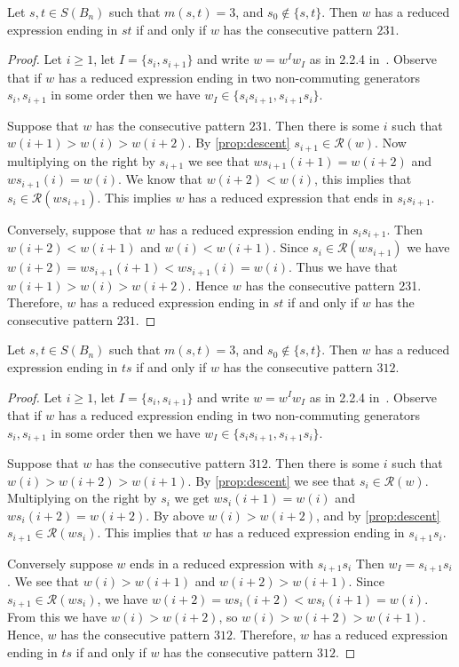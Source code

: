 \begin{lemma}\label{lem:ts}
Let $s,t \in S(B_n)$ such that $m(s,t)=3$, and $s_0 \notin \{s,t\}.$ Then $w$ has a reduced expression ending in $st$ if and only if $w$ has the consecutive pattern $231$.
\begin{proof}
	Let $i \geq 1$, let $I=\{s_i,s_{i+1}\}$ and write $w=w^Iw_I$ as in 2.2.4 in~\cite{Bjorner2005}. Observe that if $w$ has a reduced expression ending in two non-commuting generators $s_i, s_{i+1}$ in some order then we have $w_I \in \{s_is_{i+1}, s_{i+1}s_i\}$.
	
	Suppose that $w$ has the consecutive pattern $231$. Then there is some $i$ such that $w(i+1)>w(i)>w(i+2)$. By \ref{prop:descent} $s_{i+1} \in \mathcal{R}(w)$. Now multiplying on the right by $s_{i+1}$ we see that $ws_{i+1}(i+1)=w(i+2)$ and $ws_{i+1}(i)=w(i)$. We know that $w(i+2)<w(i)$, this implies that $s_i \in \mathcal{R}(ws_{i+1})$. This implies $w$ has a reduced expression that ends in $s_is_{i+1}$.
	
	 Conversely, suppose that $w$ has a reduced expression ending in $s_is_{i+1}$. Then $w(i+2)<w(i+1)$ and $w(i)<w(i+1)$. Since $s_i \in \mathcal{R}(ws_{i+1})$ we have $w(i+2)=ws_{i+1}(i+1)<ws_{i+1}(i)=w(i)$. Thus we have that $w(i+1) > w(i) > w(i+2)$. Hence $w$ has the consecutive pattern 231.
	Therefore, $w$ has a reduced expression ending in $st$ if and only if $w$ has the consecutive pattern $231$.
\end{proof}	
\end{lemma}


\begin{lemma}\label{lem:st}
Let $s,t \in S(B_n)$ such that $m(s,t)=3$, and $s_0 \notin \{s,t\}.$ Then $w$ has a reduced expression ending in $ts$ if and only if $w$ has the consecutive pattern $312$.
\begin{proof}
	Let $i \geq 1$, let $I=\{s_i,s_{i+1}\}$ and write $w=w^Iw_I$ as in 2.2.4 in~\cite{Bjorner2005}. Observe that if $w$ has a reduced expression ending in two non-commuting generators $s_i, s_{i+1}$ in some order then we have $w_I \in \{s_is_{i+1}, s_{i+1}s_i\}$.
	
	Suppose that $w$ has the consecutive pattern $312$.  Then there is some $i$ such that $w(i)>w(i+2)>w(i+1)$. By \ref{prop:descent} we see that $s_i \in \mathcal{R}(w)$. Multiplying on the right by $s_i$ we get $ws_i(i+1)=w(i)$ and $ws_i(i+2)=w(i+2)$. By above $w(i)>w(i+2)$, and by \ref{prop:descent} $s_{i+1} \in \mathcal{R}(ws_i)$. This implies that $w$ has a reduced expression ending in $s_{i+1}s_i$. 
	
	Conversely suppose $w$ ends in a reduced expression with $s_{i+1}s_i$ Then $w_I=s_{i+1}s_i$. We see that $w(i)>w(i+1)$ and $w(i+2)>w(i+1)$. Since $s_{i+1} \in \mathcal{R}(ws_i)$, we have $w(i+2)=ws_i(i+2)<ws_i(i+1)=w(i)$. From this we have $w(i)>w(i+2)$, so $w(i)>w(i+2)>w(i+1)$. Hence, $w$ has the consecutive pattern $312$. Therefore, $w$ has a reduced expression ending in $ts$ if and only if $w$ has the consecutive pattern $312$.
\end{proof}
\end{lemma}

